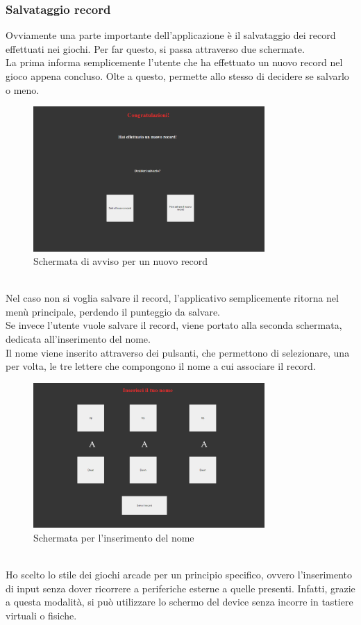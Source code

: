 \subsubsection{Salvataggio record}
Ovviamente una parte importante dell'applicazione è il salvataggio dei record effettuati nei giochi. Per far questo, si passa attraverso due schermate.\\
La prima informa semplicemente l'utente che ha effettuato un nuovo record nel gioco appena concluso. Olte a questo, permette allo stesso di decidere se salvarlo o meno.\\
\begin{figure}[h]
    \centering
    \includegraphics[width=250pt]{images/product/schermataNuovoRecord.png}
    \caption{Schermata di avviso per un nuovo record}
    \label{fig:schermataNuovoRecord}
\end{figure}
\\Nel caso non si voglia salvare il record, l'applicativo semplicemente ritorna nel menù principale, perdendo il punteggio da salvare.\\
Se invece l'utente vuole salvare il record, viene portato alla seconda schermata, dedicata all'inserimento del nome.\\
Il nome viene inserito attraverso dei pulsanti, che permettono di selezionare, una per volta, le tre lettere che compongono il nome a cui associare il record.
\begin{figure}[h]
    \centering
    \includegraphics[width=250pt]{images/product/schermataInserimentoNome.png}
    \caption{Schermata per l'inserimento del nome}
    \label{fig:schermataInserimentoNome}
\end{figure}
\\Ho scelto lo stile dei giochi arcade per un principio specifico, ovvero l'inserimento di input senza dover ricorrere a periferiche esterne a quelle presenti. Infatti, grazie a questa modalità, si può utilizzare lo schermo del device senza incorre in tastiere virtuali o fisiche.
